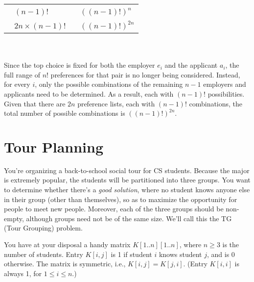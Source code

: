 \documentclass[11pt,fleqn]{exam}
\newcommand{\fillinMCmath}[1]{\begin{tikzpicture}\draw circle [radius=0.5em];\end{tikzpicture}\ #1}
\newcommand{\fillinMCmathsoln}[1]{\begin{tikzpicture}\draw[black, fill=blue] circle [radius=0.5em];\end{tikzpicture}\ #1}
\newif\ifsolutions\solutionsfalse
\newenvironment{soln}{\color{solnblue}}{}
\begin{document}
\begin{questions}
  \ifsolutions
    
  \else
    \begin{tabular}{ll}
      \hspace{1in} \fillinMCmath{} $(n-1)!$  \hspace*{.8in}          & \fillinMCmath{} $((n-1)!)^{n}$      \\
      \hspace{1in} \fillinMCmath{} $2n \times (n-1)!$ \hspace*{.8in} & \fillinMCmathsoln{} $((n-1)!)^{2n}$
    \end{tabular}
    \\
    \begin{soln}\\
      Since the top choice is fixed for both the employer $e_i$ and the applicant $a_i$, the full range of $n!$ preferences for that pair is no longer being considered. Instead, for every $i$, only the possible combinations of the remaining $n-1$ employers and applicants need to be determined. As a result, each with $(n-1)!$ possibilities. Given that there are $2n$ preference lists, each with $(n-1)!$ combinations, the total number of possible combinations is $((n-1)!)^{2n}$.
    \end{soln}
  \fi
\end{questions}


\clearpage

\section{Tour Planning}

You're organizing a back-to-school social tour for CS students. Because the major is extremely popular, the students will be partitioned into three groups. You want to determine whether there's a {\em good solution}, where no student knows anyone else in their group (other than themselves), so as to maximize the opportunity for people to meet new people. Moreover, each of the three groups should be non-empty, although groups need not be of the same size. We'll call this the TG (Tour Grouping) problem.

You have at your disposal a handy matrix $K[1..n][1..n]$, where $n\ge 3$ is the number of students. Entry $K[i,j]$ is 1 if student $i$ knows student $j$, and is 0 otherwise. The matrix is symmetric, i.e., $K[i,j] = K[j,i]$. (Entry $K[i,i]$ is always 1, for $1 \le i \le n$.)
\end{document}
